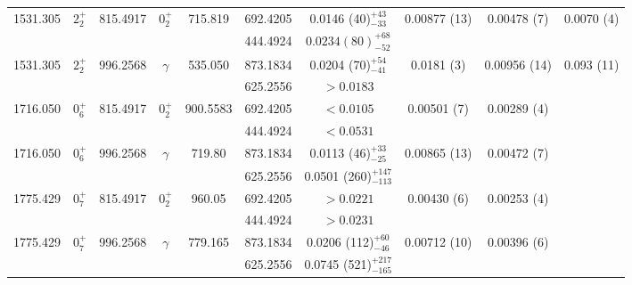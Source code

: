 \begin{landscape}
\begin{longtable}{>{\small}c|>{\small}c|>{\small}c|>{\small}c|>{\small}c|>{\small}c|>{\small}c|>{\small}c|>{\small}c|>{\small}c}
        1531.305 & $2^+_2$ & 815.4917 & $0^+_2$ & 715.819 &  692.4205 & 0.0146 (40)$^{+43}_{-33}$ & 0.00877 (13) & 0.00478 (7) & 0.0070 (4)  \\
        &  & &  & & 444.4924 & $0.0234 (80) ^{+68}_{-52}$ & & &\\ \hline
        1531.305 & $2^+_2$ & 996.2568 & $\gamma$ & 535.050 & 873.1834 & 0.0204 (70)$^{+54}_{-41}$ & 0.0181 (3) & 0.00956 (14) & 0.093 (11)  \\
        & & & &  & 625.2556 & $>0.0183$ & & & \\ \hline
        1716.050 & $0^+_6$ & 815.4917 & $0^+_2$ & 900.5583 &  692.4205 & $<0.0105$ & 0.00501 (7) & 0.00289 (4) &  \\
        & & &  & & 444.4924 & $<0.0531$ & & &  \\ \hline
        1716.050 & $0^+_6$ & 996.2568 & $\gamma$ & 719.80 & 873.1834 & 0.0113 (46)$^{+33}_{-25}$ & 0.00865 (13) & 0.00472 (7) & \\
        &  & &  &  & 625.2556 & 0.0501 (260)$^{+147}_{-113}$ & & &  \\ \hline
        1775.429 & $0^+_7$ & 815.4917 & $0^+_2$ & 960.05 &  692.4205 & $>0.0221$ & 0.00430 (6) & 0.00253 (4) &  \\
        &  & & &  & 444.4924 & $>0.0231$ & & &  \\ \hline
        1775.429 & $0^+_7$ & 996.2568 & $\gamma$ & 779.165 & 873.1834 & 0.0206 (112)$^{+60}_{-46}$ & 0.00712 (10) & 0.00396 (6) & \\
        &  & &  &  & 625.2556 & 0.0745 (521)$^{+217}_{-165}$	& & & \\
        \bottomrule
    \end{longtable}
\end{landscape}